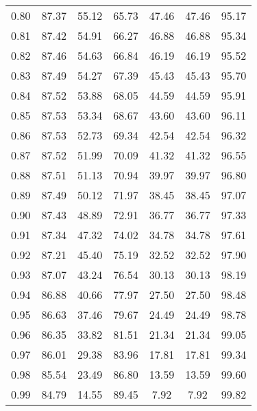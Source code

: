 \begin{tabular}{|c|c|c|c|c|c|c|}
      0.80 &     87.37 &     55.12 &      65.73 &   47.46 &      47.46 &         95.17 \\
      0.81 &     87.42 &     54.91 &      66.27 &   46.88 &      46.88 &         95.34 \\
      0.82 &     87.46 &     54.63 &      66.84 &   46.19 &      46.19 &         95.52 \\
      0.83 &     87.49 &     54.27 &      67.39 &   45.43 &      45.43 &         95.70 \\
      0.84 &     87.52 &     53.88 &      68.05 &   44.59 &      44.59 &         95.91 \\
      0.85 &     87.53 &     53.34 &      68.67 &   43.60 &      43.60 &         96.11 \\
      0.86 &     87.53 &     52.73 &      69.34 &   42.54 &      42.54 &         96.32 \\
      0.87 &     87.52 &     51.99 &      70.09 &   41.32 &      41.32 &         96.55 \\
      0.88 &     87.51 &     51.13 &      70.94 &   39.97 &      39.97 &         96.80 \\
      0.89 &     87.49 &     50.12 &      71.97 &   38.45 &      38.45 &         97.07 \\
      0.90 &     87.43 &     48.89 &      72.91 &   36.77 &      36.77 &         97.33 \\
      0.91 &     87.34 &     47.32 &      74.02 &   34.78 &      34.78 &         97.61 \\
      0.92 &     87.21 &     45.40 &      75.19 &   32.52 &      32.52 &         97.90 \\
      0.93 &     87.07 &     43.24 &      76.54 &   30.13 &      30.13 &         98.19 \\
      0.94 &     86.88 &     40.66 &      77.97 &   27.50 &      27.50 &         98.48 \\
      0.95 &     86.63 &     37.46 &      79.67 &   24.49 &      24.49 &         98.78 \\
      0.96 &     86.35 &     33.82 &      81.51 &   21.34 &      21.34 &         99.05 \\
      0.97 &     86.01 &     29.38 &      83.96 &   17.81 &      17.81 &         99.34 \\
      0.98 &     85.54 &     23.49 &      86.80 &   13.59 &      13.59 &         99.60 \\
      0.99 &     84.79 &     14.55 &      89.45 &    7.92 &       7.92 &         99.82 \\
\bottomrule
\end{tabular}
